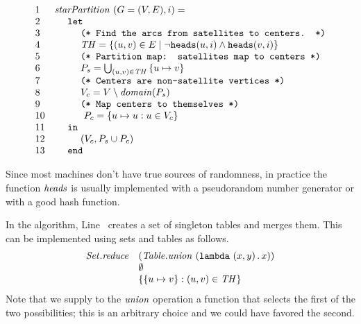 \begin{flex}
\begin{algorithm}
\[
\begin{array}{ll}
1 & \cdvar{starPartition}~(G=(V,E),i) =
\\
2 & ~~~~\cd{let}
\\
3 & ~~~~~~~~\cd{(* Find the arcs from satellites to centers. *)}
\\
4 & ~~~~~~~~\mathit{TH} = \csetf{(u,v) \in E}{\neg \cheads(u,i) \land \cheads(v,i)} %
\\
5 & ~~~~~~~~\cd{(* Partition map: satellites map to centers *)}
\\
6 & ~~~~~~~~P_s = \bigcup_{(u,v) \in \mathit{TH}} \cset{u \mapsto v}
\\
7 & ~~~~~~~~\cd{(* Centers are non-satellite vertices *)}
\\
8 & ~~~~~~~~V_c = V \setminus \cdvar{domain}(P_s)
\\
9 & ~~~~~~~~\cd{(* Map centers to themselves *)}
\\
10 & ~~~~~~~~~P_c = \cset{u \mapsto u : u \in V_c} %
\\
11 & ~~~~\cd{in}
\\
12 & ~~~~~~~~(V_c, P_s \cup P_c)
\\
13 & ~~~~\cd{end}
\end{array}
\]


\end{algorithm}

\begin{note}
\label{graphcon::star::partition::implementing-heads}

Since most machines don't have true sources of randomness, in practice
the function $\mathit{heads}$ is usually implemented with a
pseudorandom number generator or with a good hash function.

In the algorithm, Line~\linegcstarmerge{} creates a set of
singleton tables and merges them.
%
This can be implemented using sets and tables as follows.
%
\[
\begin{array}{ll}
  \mathit{Set.reduce}
  & (\mathit{Table.union}~(\texttt{lambda}~{(x,y)}\,.\,x))
\\
& \emptyset
\\
& \left\{ \left\{ u \mapsto v \right\} : (u,v) \in \mathit{TH} \right\}
\end{array}
\]
Note that we supply to the $\mathit{union}$ operation a function that selects the first of the two possibilities; this is an arbitrary choice and we could have favored the second.

\end{note}


\end{flex}
